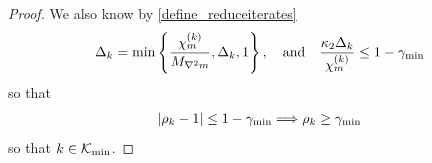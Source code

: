 \begin{proof}
We also know by \cref{define_reduceiterates}
\begin{align*}
\Delta_k = \min\left\{\frac {{\chi_m^{(k)}}} {{M_{\nabla^2 m}}}, \Delta_k, 1 \right\}, \quad \textrm{and} \quad
\frac {{\kappa_2} \Delta_k}{{\chi_m^{(k)}}} \le 1 - \gamma_{\textrm{min}}
\end{align*}
so that
\begin{align*}
\left|\rho_k - 1\right| \le 1 - \gamma_{\textrm{min}}
\Longrightarrow \rho_k \ge \gamma_{\textrm{min}}
\end{align*}
so that $k \in {\mathcal K_{\textrm{min}}}$.
\end{proof}


% 


